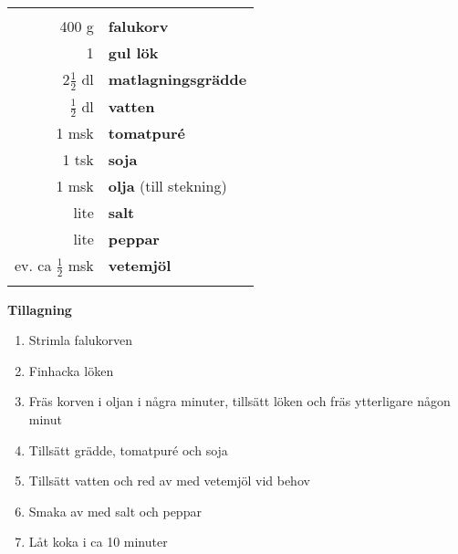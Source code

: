 \begin{table}[H]
	\begin{tabular}{rl}
	\hline
	&\\
		400 g & \textbf{falukorv}\\
		1 & \textbf{gul lök}\\
		2$\frac{1}{2}$ dl & \textbf{matlagningsgrädde}\\
		$\frac{1}{2}$ dl & \textbf{vatten}\\
		1 msk & \textbf{tomatpuré}\\
		1 tsk & \textbf{soja}\\
		1 msk & \textbf{olja} (till stekning)\\
		lite & \textbf{salt}\\
		lite & \textbf{peppar}\\
		ev. ca $\frac{1}{2}$ msk & \textbf{vetemjöl}\\
	&\\
	\hline
	\end{tabular}
\end{table}


\begin{multicols*}{2}

\noindent \textbf{Tillagning}
\begin{enumerate}
	\itemsep0cm
	\item Strimla falukorven
	\item Finhacka löken
	\item Fräs korven i oljan i några \mbox{minuter}, tillsätt löken och fräs ytterligare någon minut
	\item Tillsätt grädde, tomatpuré och soja
	\item Tillsätt vatten och red av med vetemjöl vid behov
	\item Smaka av med salt och peppar
	\item Låt koka i ca 10 minuter
\end{enumerate}

\end{multicols*}

\clearpage